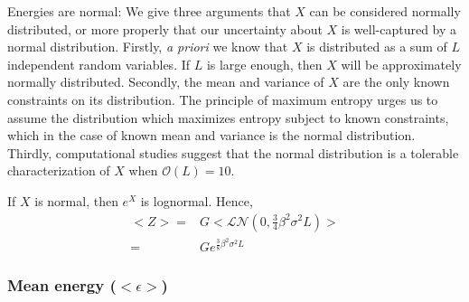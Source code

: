 \documentclass{article}
\newcommand{\ep}{\epsilon}
\begin{document}
Energies are normal: We give three arguments that
$X$ can be considered normally distributed, or more properly that our
uncertainty about $X$ is well-captured by a normal distribution.
Firstly, \textit{a priori} we know that $X$ is distributed as a sum of
$L$ independent random variables.  If $L$ is large enough, then $X$
will be approximately normally distributed.  Secondly, the mean and
variance of $X$ are the only known constraints on its distribution.
The principle of maximum entropy urges us to assume the distribution
which maximizes entropy subject to known constraints, which in the
case of known mean and variance is the normal distribution.  Thirdly,
computational studies suggest that the normal distribution is a
tolerable characterization of $X$ when $\mathcal{O}(L) = 10$.

If $X$ is normal, then $e^X$ is lognormal.  Hence, 
\begin{align*}
  <Z> =& G<\mathcal{LN}(0,\frac{3}{4}\beta^2\sigma^2L)>\\
  =&Ge^{\frac{3}{8}\beta^2\sigma^2L}
\end{align*}


\subsubsection{Mean energy ($<\ep>$)}



{}  \newpage
\end{document}
